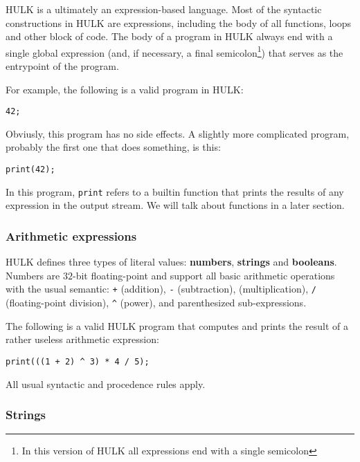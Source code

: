 \documentclass[a4paper, 12pt]{report}
\begin{document}
HULK is a ultimately an expression-based language. Most of the syntactic constructions in HULK are expressions,
including the body of all functions, loops and other block of code. The body of a program in HULK always end with a single global expression (and, if necessary, a final semicolon\footnote{In this
version of HULK all expressions end with a single semicolon}) that serves as the entrypoint of the program.

For example, the following is a valid program in HULK:

\begin{lstlisting}
42;
\end{lstlisting}

Obviusly, this program has no side effects. A slightly more complicated program, probably the first
one that does something, is this:

\begin{lstlisting}
print(42);
\end{lstlisting}

In this program, {\tt print} refers to a builtin function that prints the results of any expression in the
output stream. We will talk about functions in a later section.

\subsubsection*{Arithmetic expressions}

HULK defines three types of literal values: {\bf numbers}, {\bf strings} and {\bf booleans}. Numbers are $32$-bit floating-point
and support all basic arithmetic operations with the usual semantic: {\tt +} (addition), {\tt -} (subtraction), {\tt *} (multiplication),
{\tt \slash} (floating-point division), {\tt \^{}} (power), and parenthesized sub-expressions.

The following is a valid HULK program that computes and prints the result of a rather useless arithmetic expression:

\begin{lstlisting}
print(((1 + 2) ^ 3) * 4 / 5);
\end{lstlisting}

All usual syntactic and procedence rules apply.

\subsubsection*{Strings}
\end{document}
